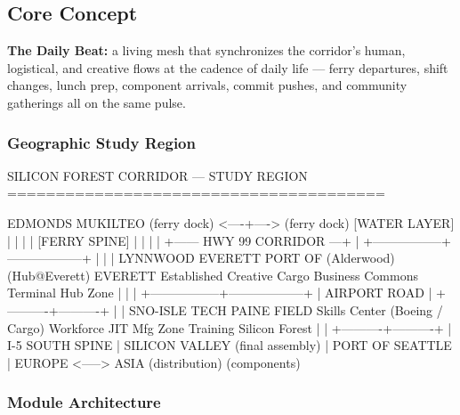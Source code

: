 \documentclass[11pt,letterpaper]{article}
\begin{document}
\subsection{Core Concept}

\textbf{The Daily Beat:} a living mesh that synchronizes the corridor's human, logistical, and creative flows at the cadence of daily life --- ferry departures, shift changes, lunch prep, component arrivals, commit pushes, and community gatherings all on the same pulse.

\subsubsection{Geographic Study Region}

\begin{asciibox}
SILICON FOREST CORRIDOR — STUDY REGION
=======================================

  EDMONDS                    MUKILTEO
  (ferry dock)  <----+---->  (ferry dock)        [WATER LAYER]
        |             |             |
        |        [FERRY SPINE]      |
        |             |             |
        +------  HWY 99 CORRIDOR ---+
                      |
    +-----------------+------------------+
    |                 |                  |
 LYNNWOOD         EVERETT           PORT OF
 (Alderwood)    (Hub@Everett)       EVERETT
 Established    Creative             Cargo
 Business       Commons              Terminal
 Hub            Zone
    |                 |                  |
    +-----------------+------------------+
                      |
              AIRPORT ROAD
                      |
           +----------+----------+
           |                     |
      SNO-ISLE TECH          PAINE FIELD
      Skills Center          (Boeing / Cargo)
      Workforce              JIT Mfg Zone
      Training               Silicon Forest
           |                     |
           +----------+----------+
                      |
              I-5 SOUTH SPINE
                      |
                SILICON VALLEY
                (final assembly)
                      |
               PORT OF SEATTLE
                      |
            EUROPE <-----> ASIA
            (distribution)   (components)
\end{asciibox}

\subsubsection{Module Architecture}
\end{document}
